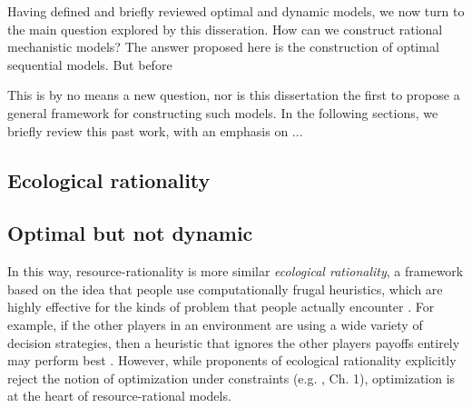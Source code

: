 Having defined and briefly reviewed optimal and dynamic models, we now turn to the main question explored by this disseration. How can we construct rational mechanistic models? The answer proposed here is the construction of optimal sequential models. But before

This is by no means a new question, nor is this dissertation the first to propose a general framework for constructing such models. In the following sections, we briefly review this past work, with an emphasis on ...

\subsection{Ecological rationality}





\subsection{Optimal but not dynamic}




In this way, resource-rationality is more similar \emph{ecological rationality}, a framework based on the idea that people use computationally frugal heuristics, which are highly effective for the kinds of problem that people actually encounter \citep{gigerenzer1999simple,goldstein2002models,todd2012ecological}. For example, if the other players in an environment are using a wide variety of decision strategies, then a heuristic that ignores the other players payoffs entirely may perform best \citep{spiliopoulos2020map}. However, while proponents of ecological rationality explicitly reject the notion of optimization under constraints (e.g. \citealp{gigerenzer1999simple}, Ch. 1), optimization is at the heart of resource-rational models.




